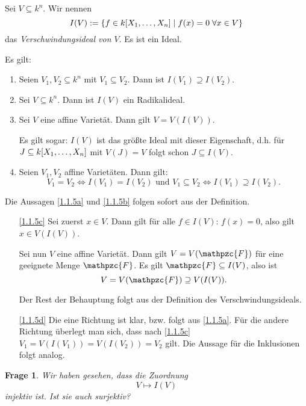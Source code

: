 \documentclass[a4paper,12pt]{scrbook}
\makeatletter
\theoremstyle{blah}
\newtheorem*{q}{Frage}
\theoremstyle{stz}
\renewcommand{\proofname}{Beweis}
\renewenvironment{proof}[1][\proofname]{\par
  \pushQED{\qed}%
  \normalfont \topsep6\p@\@plus6\p@\relax
  \trivlist
  \item[\hskip\labelsep
        \itshape
    #1\@addpunct{:}]\ignorespaces
}{%
  \popQED\endtrivlist\@endpefalse
}
\newcommand{\F}{\mathpzc{F}}
\renewcommand{\mapsto}{\longmapsto}
\newcommand{\polyx}{\ensuremath%
  [X_{1},\dotsc,X_{n}]}
\makeatother
\begin{document}
\begin{db}
Sei $V\subseteq k^{n}$. Wir nennen
\[I(V):=\{f\in k\polyx\mid f(x)=0\;\forall x\in V\}\]
das \emph{Verschwindungsideal von $V$}. Es ist ein Ideal.
\end{db}

\begin{bem} Es gilt:
\begin{enumerate}
\item\label{1.1.5a} Seien $V_{1},V_{2}\subseteq k^{n}$ mit $V_{1}\subseteq V_{2}$. Dann ist $I(V_{1})\supseteq I(V_{2})$.
\item\label{1.1.5b} Sei $V\subseteq k^{n}$. Dann ist $I(V)$ ein Radikalideal.
\item\label{1.1.5c} Sei $V$ eine affine Varietät. Dann gilt $V=V(I(V))$.

Es gilt sogar: $I(V)$ ist das größte Ideal mit dieser Eigenschaft, d.h. für $J\subseteq k\polyx$ mit $V(J)=V$ folgt schon $J\subseteq I(V)$.
\item\label{1.1.5d} Seien $V_{1},V_{2}$ affine Varietäten. Dann gilt:
\[V_{1}=V_{2}\iff I(V_{1})=I(V_{2})\text{ und } V_{1}\subseteq V_{2}\iff I(V_{1})\supseteq I(V_{2}).\]
\end{enumerate}
\end{bem}

\begin{proof} Die Aussagen \ref{1.1.5a} und \ref{1.1.5b} folgen sofort aus der Definition.
\begin{enumerate}
\item[\ref{1.1.5c}] Sei zuerst $x\in V$. Dann gilt für alle $f\in I(V)$: $f(x)=0$, also gilt $x\in V(I(V))$.

Sei nun $V$ eine affine Varietät. Dann gilt $V=V(\F)$ für eine geeignete Menge $\F$. Es gilt $\F\subseteq I(V)$, also ist
\[V=V(\F)\supseteq V(I(V)).\]

Der Rest der Behauptung folgt aus der Definition des Verschwindungsideals.
\item[\ref{1.1.5d}] Die eine Richtung ist klar, bzw. folgt aus \ref{1.1.5a}. Für die andere Richtung überlegt man sich, dass nach \ref{1.1.5c} $V_{1}=V(I(V_{1}))=V(I(V_{2}))=V_{2}$ gilt.  Die Aussage für die Inklusionen folgt analog.\qedhere
\end{enumerate}
\end{proof}

\begin{q}
Wir haben gesehen, dass die Zuordnung
\[V\mapsto I(V)\]
injektiv ist. Ist sie auch surjektiv?
\end{q}
\end{document}
